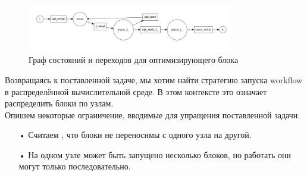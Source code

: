 \documentclass[a4paper,14pt]{article}
\begin{document}
\begin{figure}[here]
    \centering
    \includegraphics[width=0.8\textwidth]{optimization_petri_net.png}
    \caption{Граф состояний и переходов для оптимизирующего блока }
    \label{img:opt_wf}
\end{figure}




Возвращаясь к поставленной задаче, мы хотим найти стратегию запуска workflow в распределённой вычислительной среде.
В этом контексте это означает распределить блоки по узлам.
\\ Опишем некоторые ограничение, вводимые для упращения поставленной задачи.
\begin{enumerate}
\item[•] Считаем , что блоки не переносимы с одного узла на другой.
\item[•] На одном узле может быть запущено несколько блоков, но работать они могут только последовательно.
\end{enumerate}
\end{document}

